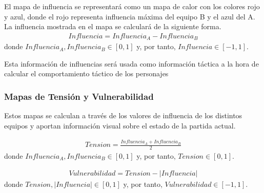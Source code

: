 El mapa de influencia se representará como un mapa de calor con los colores rojo y azul, donde el rojo representa influencia máxima del equipo B y el azul del A. La influencia mostrada en el mapa se calculará de la siguiente forma.
\begin{gather*}
    Influencia = Influencia_A - Influencia_B
\end{gather*}
donde $Influencia_A, Influencia_B \in [0,1]$ y, por tanto, $Influencia \in [-1, 1]$.


Esta información de influencias será usada como información táctica a la hora de calcular el comportamiento táctico de los personajes

\subsubsection{Mapas de Tensión y Vulnerabilidad}

Estos mapas se calculan a través de los valores de influencia de los distintos equipos y aportan información visual sobre el estado de la partida actual.

\begin{gather*}
    Tension = \frac{Influencia_A + Influencia_B}{2}
\end{gather*}
donde $Influencia_A, Influencia_B \in [0,1]$ y, por tanto, $Tension \in [0, 1]$.

\begin{gather*}
    Vulnerabilidad = Tension - \lvert Influencia \rvert
\end{gather*}
donde $Tension, \lvert Influencia \rvert \in [0,1]$ y, por tanto, $Vulnerabilidad \in [-1, 1]$.


